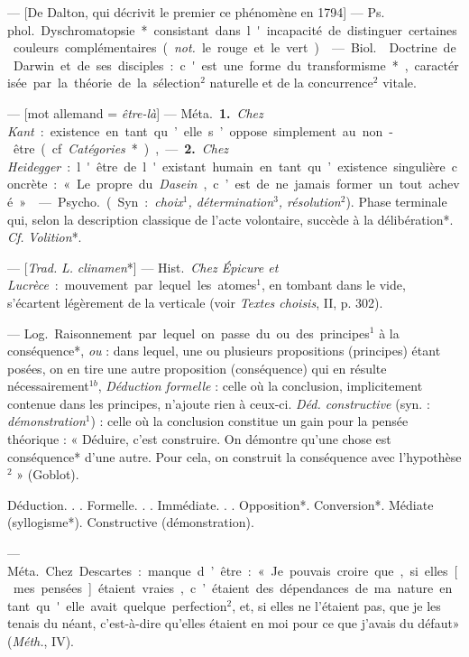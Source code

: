 
	\begin{itemize}[leftmargin=1cm, label=, itemsep=1pt]

 — [De Dalton, qui décrivit
le premier ce phénomène en 1794]
— \si{Ps. phol.} Dyschromatopsie* consistant dans l'incapacité de distinguer certaines couleurs complémentaires ({\it not.} le rouge et le vert).

 — \si{Biol.}  Doctrine de
Darwin et de ses disciples : c'est
une forme du transformisme*, caractérisée par la théorie de la sélection$^2$
naturelle et de la concurrence$^2$
vitale.

 — [mot allemand = {\it être-là}] —
\si{Méta.} {\bf 1.} {\it Chez Kant} : existence en
tant qu’elle s’oppose simplement au
non-être (cf. {\it Catégories}*), — {\bf 2.} {\it Chez
Heidegger} : l'être de l'existant
humain en tant qu’existence singulière concrète : « Le propre du {\it Dasein},
c’est de ne jamais former un tout
achevé. »

 — \si{Psycho.} (Syn. : {\it choix$^1$,
détermination$^3$, résolution}$^2$). Phase
terminale qui, selon la description
classique de l’acte volontaire, succède à la délibération*. {\it Cf.} {\it Volition}*.

 — [{\it Trad.} {\it L.} {\it clinamen}*] —
\si{Hist.} {\it Chez Épicure et Lucrèce} : mouvement par lequel les atomes$^1$, en
tombant dans le vide, s’écartent
légèrement de la verticale (voir
{\it Textes choisis}, II, p. 302).

 — \si{Log.} Raisonnement
par lequel on passe du ou des principes$^1$ à la conséquence*, {\it ou} : dans
lequel, une ou plusieurs propositions (principes) étant posées, on en
tire une autre proposition (conséquence) qui en résulte
nécessairement$^{1b}$, {\it Déduction formelle} : celle où
la conclusion, implicitement contenue dans les principes, n’ajoute
rien à ceux-ci. {\it Déd. constructive}
(syn. : {\it démonstration}$^1$) : celle où la
conclusion constitue un gain pour la
pensée théorique : « Déduire, c’est
construire. On démontre qu’une
chose est conséquence* d’une autre.
Pour cela, on construit la conséquence avec l'hypothèse$^2$ » (Goblot).

Déduction. . .
 Formelle. . .
  Immédiate. . .
   Opposition*. 
   Conversion*.
  Médiate (syllogisme*).
 Constructive (démonstration).

 — \si{Méta.} Chez Descartes :
manque d’être : « Je pouvais croire
que, si elles [mes pensées] étaient
vraies, c’étaient des dépendances
de ma nature en tant qu'elle avait
quelque perfection$^2$, et, si elles ne
l’étaient pas, que je les tenais du
néant, c'est-à-dire qu’elles étaient
en moi pour ce que j'avais du défaut»
({\it Méth.}, IV).


\end{itemize}
